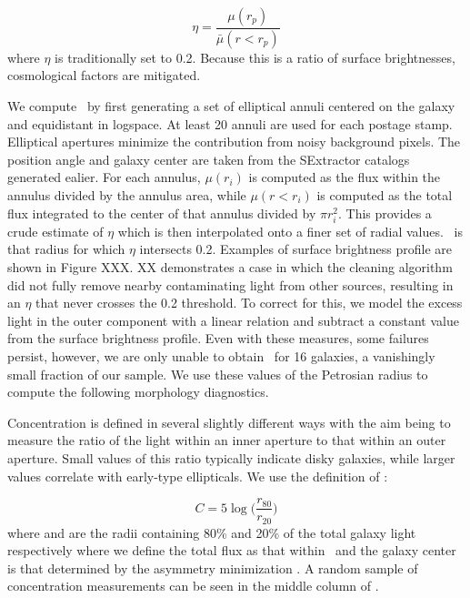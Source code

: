 \begin{equation}\label{fig: petrosian raidus}
\eta = \frac{\mu(r_p)}{\bar\mu(r<r_p)}
\end{equation}
where $\eta$ is traditionally set to 0.2. Because this is a ratio of surface brightnesses, cosmological factors are mitigated. 

We compute \rp~by first generating a set of elliptical annuli centered on the galaxy and equidistant in logspace. At least 20 annuli are used for each postage stamp. Elliptical apertures minimize the contribution from noisy background pixels. The position angle and galaxy center are taken from the SExtractor catalogs generated ealier. For each annulus, $\mu(r_i)$ is computed as the flux within the annulus divided by the annulus area, while $\mu(r<r_i)$ is computed as the total flux integrated to the center of that annulus divided by $\pi r_i^2$. This provides a crude estimate of $\eta$ which is then interpolated onto a finer set of radial values.  \rp~is that radius for which $\eta$ intersects 0.2. Examples of surface brightness profile are shown in Figure XXX. XX demonstrates a case in which the cleaning algorithm did not fully remove nearby contaminating light from other sources, resulting in an $\eta$ that never crosses the 0.2 threshold. To correct for this, we model the excess light in the outer component with a linear relation and subtract a constant value from the surface brightness profile. Even with these measures, some failures persist, however, we are only unable to obtain \rp~for 16 galaxies, a vanishingly small fraction of our sample. We use these values of the Petrosian radius to compute the following morphology diagnostics.


Concentration is defined in several slightly different ways with the aim being to measure the ratio of the light within an inner aperture to that within an outer aperture. Small values of this ratio typically indicate disky galaxies, while larger values correlate with early-type ellipticals. We use the definition of \cite{Bershady2000}:

\begin{equation}\label{eqn: concentration}
C = 5\log\Big(\frac{r_{80}}{r_{20}}\Big) 
\end{equation}
where  and  are the radii containing 80\% and 20\% of the total galaxy light respectively where we define the total flux as that within \rp~and the galaxy center is that determined by the asymmetry minimization \cite[described below,][]{Lotz2004}. A random sample of concentration measurements can be seen in the middle column of . 

